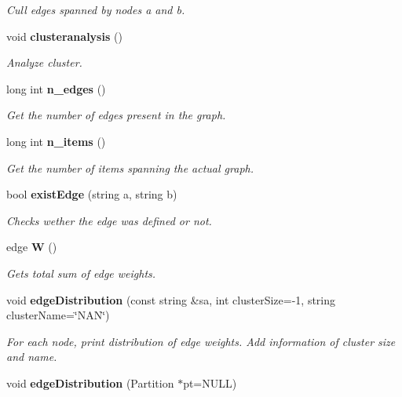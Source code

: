 \begin{CompactItemize}
\begin{CompactList}\small\item\em Cull edges spanned by nodes a and b. \item\end{CompactList}\item 
void {\bf clusteranalysis} ()\label{classMatrixOfValues_a22}

\begin{CompactList}\small\item\em Analyze cluster. \item\end{CompactList}\item 
long int {\bf n\_\-edges} ()\label{classMatrixOfValues_a23}

\begin{CompactList}\small\item\em Get the number of edges present in the graph. \item\end{CompactList}\item 
long int {\bf n\_\-items} ()\label{classMatrixOfValues_a24}

\begin{CompactList}\small\item\em Get the number of items spanning the actual graph. \item\end{CompactList}\item 
bool {\bf exist\-Edge} (string a, string b)\label{classMatrixOfValues_a25}

\begin{CompactList}\small\item\em Checks wether the edge was defined or not. \item\end{CompactList}\item 
edge {\bf W} ()\label{classMatrixOfValues_a26}

\begin{CompactList}\small\item\em Gets total sum of edge weights. \item\end{CompactList}\item 
void {\bf edge\-Distribution} (const string \&sa, int cluster\-Size=-1, string cluster\-Name=\char`\"{}NAN\char`\"{})
\begin{CompactList}\small\item\em For each node, print distribution of edge weights. Add information of cluster size and name. \item\end{CompactList}\item 
void {\bf edge\-Distribution} (Partition $\ast$pt=NULL)\label{classMatrixOfValues_a28}


\end{CompactItemize}
